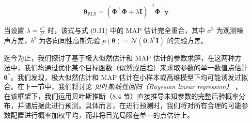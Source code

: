 \begin{equation}
\boldsymbol{\theta}_{\text{RLS}} = (\boldsymbol{\Phi}^\top \boldsymbol{\Phi} + \lambda \boldsymbol{I})^{-1}\boldsymbol{\Phi}^\top \boldsymbol{y}
\tag{9.34}
\end{equation}

当设置 $ \lambda = \frac{\sigma^2}{b^2} $ 时，该式与式 (9.31) 中的 MAP 估计完全重合，其中 $ \sigma^2 $ 为观测噪声方差，$ b^2 $ 为各向同性高斯先验 $ p(\boldsymbol{\theta}) = \mathcal{N}(\boldsymbol{0}, b^2\boldsymbol{I}) $ 的先验方差。

迄今为止，我们探讨了基于极大似然估计和 MAP 估计的参数求解，在这两种方法中，我们均通过优化某个目标函数（似然或后验）来求取参数的单一数值点估计 $ \boldsymbol{\theta}^* $。我们发现，极大似然估计和 MAP 估计在小样本或高维模型下均可能诱发过拟合。在下一节中，我们将讨论 \emph{贝叶斯线性回归（Bayesian linear regression）} ，在该框架下，我们运用贝叶斯推断（8.4 节）直接推导未知参数的完整后验概率分布，并随后据此进行预测。具体而言，在进行预测时，我们将对所有合理的可能参数配置进行概率加权平均，而非将目光局限在单一的点估计上。
